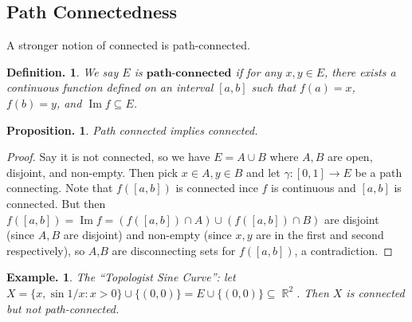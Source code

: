 \documentclass[11pt, a4paper]{memoir}
\DeclareMathOperator{\R}{{\mathbb{R}}}
\theoremstyle{change}
\newtheorem{proposition}[theorem]{Proposition.}
\theoremstyle{plain}
\theoremstyle{nonumberplain}
\newtheorem{definition}{Definition.}
\newtheorem{example}{Example.}
\newtheorem{proof}{Proof}
\renewcommand{\Im}{\ensuremath{\operatorname{Im}}}
\renewcommand{\Im}{\ensuremath{\operatorname{Im}}}
\numberwithin{equation}{section}
\begin{document}
\subsection{Path Connectedness}
A stronger notion of connected is path-connected.
\begin{definition}
    We say $E$ is $\textbf{path-connected}$ if for any $x,y\in E$, there exists a continuous function defined on an interval
    $[a,b]$ such that $f(a)=x$, $f(b)=y$, and $\Im f\subseteq E$.
\end{definition}
\begin{proposition}
    Path connected implies connected.
\end{proposition}
\begin{proof}
    Say it is not connected, so we have $E=A\cup B$ where $A,B$ are open, disjoint, and non-empty. Then pick
    $x\in A,y\in B$ and let $\gamma:[0,1]\to E$ be a path connecting. Note that $f([a,b])$ is connected ince
    $f$ is continuous and $[a,b]$ is connected. But then $f([a,b])=\Im f=(f([a,b])\cap A)\cup(f([a,b])\cap B)$ are disjoint
    (since $A,B$ are disjoint) and non-empty (since $x,y$ are in the first and second respectively), so
    $A$,$B$ are disconnecting sets for $f([a,b])$, a contradiction.
\end{proof}
\begin{example}
    The ``Topologist Sine Curve'': let $X=\{x,\sin 1/x:x>0\}\cup\{(0,0)\}=E\cup\{(0,0)\}\subseteq\R^2$. Then $X$ is connected
    but not path-connected.
\end{example}
\end{document}
